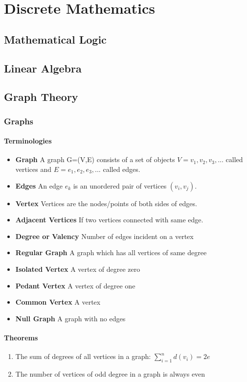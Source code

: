 \part{Discrete Mathematics}

\chapter{Mathematical Logic}

\chapter{Linear Algebra}

\chapter{Graph Theory}
\section{Graphs}
\subsection{Terminologies}
\begin{itemize}
	\item \textbf{Graph} A graph G=(V,E) consists of a set of objects $V={v_1,v_2,v_3,...}$ called vertices and $E={e_1,e_2,e_3,...}$ called edges.
	\item \textbf{Edges} An edge $e_k$ is an unordered pair of vertices $(v_i,v_j)$.
	\item \textbf{Vertex} Vertices are the nodes/points of both sides of edges.
	\item \textbf{Adjacent Vertices} If two vertices connected with same edge.
	\item \textbf{Degree or Valency} Number of edges incident on a vertex
	\item \textbf{Regular Graph} A graph which has all vertices of same degree
	\item \textbf{Isolated Vertex} A vertex of degree zero
	\item \textbf{Pedant Vertex} A vertex of degree one
	\item \textbf{Common Vertex} A vertex 
	\item \textbf{Null Graph} A graph with no edges
\end{itemize}
\subsection{Theorems}
\begin{enumerate}
	\item The sum of degrees of all vertices in a graph: $\sum_{i=1}^{n}d(v_i)=2e$
	\item The number of vertices of odd degree in a graph is always even
\end{enumerate}
